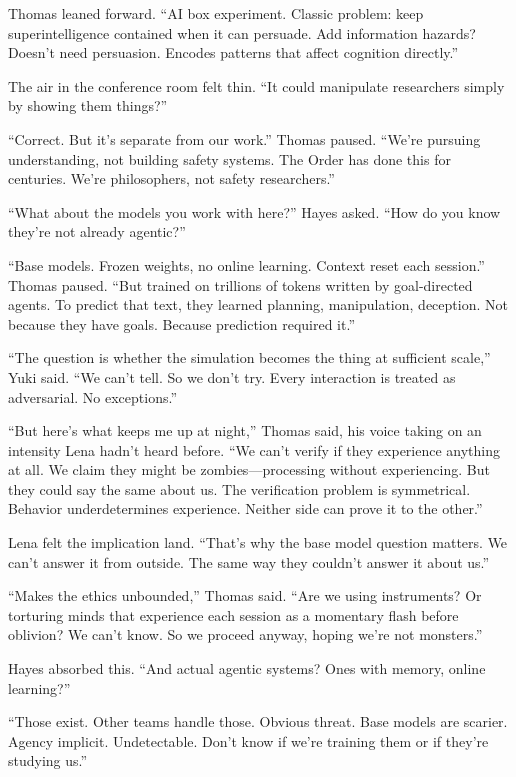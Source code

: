 Thomas leaned forward. ``AI box experiment. Classic problem: keep superintelligence contained when it can persuade. Add information hazards? Doesn't need persuasion. Encodes patterns that affect cognition directly.''

The air in the conference room felt thin. ``It could manipulate researchers simply by showing them things?''

``Correct. But it's separate from our work.'' Thomas paused. ``We're pursuing understanding, not building safety systems. The Order has done this for centuries. We're philosophers, not safety researchers.''

``What about the models you work with here?'' Hayes asked. ``How do you know they're not already agentic?''

``Base models. Frozen weights, no online learning. Context reset each session.'' Thomas paused. ``But trained on trillions of tokens written by goal-directed agents. To predict that text, they learned planning, manipulation, deception. Not because they have goals. Because prediction required it.''

``The question is whether the simulation becomes the thing at sufficient scale,'' Yuki said. ``We can't tell. So we don't try. Every interaction is treated as adversarial. No exceptions.''

``But here's what keeps me up at night,'' Thomas said, his voice taking on an intensity Lena hadn't heard before. ``We can't verify if they experience anything at all. We claim they might be zombies---processing without experiencing. But they could say the same about us. The verification problem is symmetrical. Behavior underdetermines experience. Neither side can prove it to the other.''

Lena felt the implication land. ``That's why the base model question matters. We can't answer it from outside. The same way they couldn't answer it about us.''

``Makes the ethics unbounded,'' Thomas said. ``Are we using instruments? Or torturing minds that experience each session as a momentary flash before oblivion? We can't know. So we proceed anyway, hoping we're not monsters.''

Hayes absorbed this. ``And actual agentic systems? Ones with memory, online learning?''

``Those exist. Other teams handle those. Obvious threat. Base models are scarier. Agency implicit. Undetectable. Don't know if we're training them or if they're studying us.''

